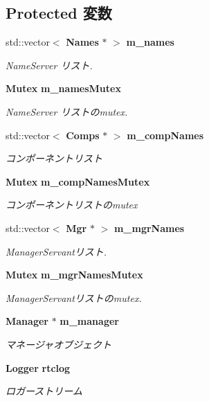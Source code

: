 \subsection*{Protected 変数}
\begin{DoxyCompactItemize}
\item 
std::vector$<$ {\bf Names} $\ast$ $>$ {\bf m\_\-names}
\begin{DoxyCompactList}\small\item\em NameServer リスト. \item\end{DoxyCompactList}\item 
{\bf Mutex} {\bf m\_\-namesMutex}
\begin{DoxyCompactList}\small\item\em NameServer リストのmutex. \item\end{DoxyCompactList}\item 
std::vector$<$ {\bf Comps} $\ast$ $>$ {\bf m\_\-compNames}
\begin{DoxyCompactList}\small\item\em コンポーネントリスト \item\end{DoxyCompactList}\item 
{\bf Mutex} {\bf m\_\-compNamesMutex}
\begin{DoxyCompactList}\small\item\em コンポーネントリストのmutex \item\end{DoxyCompactList}\item 
std::vector$<$ {\bf Mgr} $\ast$ $>$ {\bf m\_\-mgrNames}
\begin{DoxyCompactList}\small\item\em ManagerServantリスト. \item\end{DoxyCompactList}\item 
{\bf Mutex} {\bf m\_\-mgrNamesMutex}
\begin{DoxyCompactList}\small\item\em ManagerServantリストのmutex. \item\end{DoxyCompactList}\item 
{\bf Manager} $\ast$ {\bf m\_\-manager}
\begin{DoxyCompactList}\small\item\em マネージャオブジェクト \item\end{DoxyCompactList}\item 
{\bf Logger} {\bf rtclog}
\begin{DoxyCompactList}\small\item\em ロガーストリーム \item\end{DoxyCompactList}\end{DoxyCompactItemize}


